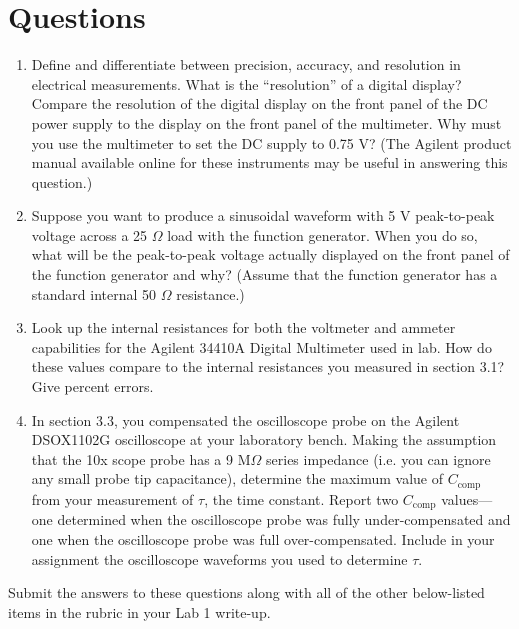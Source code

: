 \documentclass[12pt]{../manual}
\begin{document}
\section{Questions}
\begin{enumerate}
\item Define and differentiate between precision, accuracy, and resolution in electrical measurements. What is the ``resolution'' of a digital display? Compare the resolution of the digital display on the front panel of the DC power supply to the display on the front panel of the multimeter. Why must you use the multimeter to set the DC supply to 0.75 V? (The Agilent product manual available online for these instruments may be useful in answering this question.)
\item Suppose you want to produce a sinusoidal waveform with 5 V peak-to-peak voltage across a 25 $\Omega$ load with the function generator. When you do so, what will be the peak-to-peak voltage actually displayed on the front panel of the function generator and why? (Assume that the function generator has a standard internal 50 $\Omega$ resistance.)
\item Look up the internal resistances for both the voltmeter and ammeter capabilities for the Agilent 34410A Digital Multimeter used in lab. How do these values compare to the internal resistances you measured in section 3.1? Give percent errors.
\item In section 3.3, you compensated the oscilloscope probe on the Agilent DSOX1102G oscilloscope at your laboratory bench.  Making the assumption that the 10x scope probe has a 9 M$\Omega$ series impedance (i.e. you can ignore any small probe tip capacitance), determine the maximum value of $C_{\mathrm{comp}}$ from your measurement of $\tau$, the time constant.  Report two $C_{\mathrm{comp}}$ values---one determined when the oscilloscope probe was fully under-compensated and one when the oscilloscope probe was full over-compensated.  Include in your assignment the oscilloscope waveforms you used to determine $\tau$. 
\end{enumerate}

Submit the answers to these questions along with all of the other below-listed items in the rubric in your Lab 1 write-up. 
\end{document}
